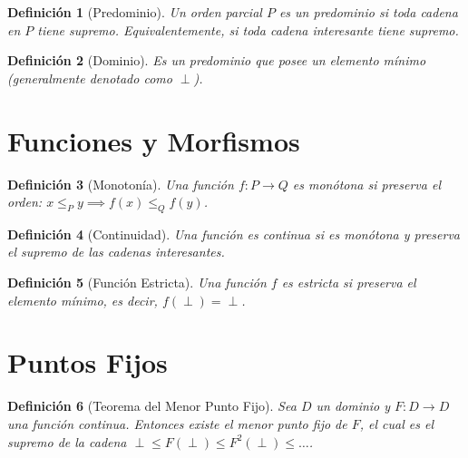 \documentclass{article}
\newtheorem{definition}{Definición}
\begin{document}
\begin{definition}[Predominio]
Un orden parcial $P$ es un predominio si toda cadena en $P$ tiene supremo. Equivalentemente, si toda cadena interesante tiene supremo.
\end{definition}

\begin{definition}[Dominio]
Es un predominio que posee un elemento mínimo (generalmente denotado como $\perp$).
\end{definition}

\section{Funciones y Morfismos}

\begin{definition}[Monotonía]
Una función $f: P \to Q$ es monótona si preserva el orden: $x \le_P y \implies f(x) \le_Q f(y)$.
\end{definition}

\begin{definition}[Continuidad]
Una función es continua si es monótona y preserva el supremo de las cadenas interesantes.
\end{definition}

\begin{definition}[Función Estricta]
Una función $f$ es estricta si preserva el elemento mínimo, es decir, $f(\perp) = \perp$.
\end{definition}

\section{Puntos Fijos}

\begin{definition}[Teorema del Menor Punto Fijo]
Sea $D$ un dominio y $F: D \to D$ una función continua. Entonces existe el menor punto fijo de $F$, el cual es el supremo de la cadena $\perp \le F(\perp) \le F^2(\perp) \le \dots$.
\end{definition}
\end{document}
